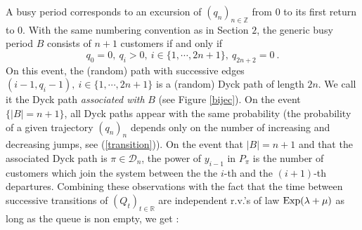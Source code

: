 \documentclass[11pt,a4paper]{article}
\numberwithin{equation}{section}
\newcommand{\mrm}[1]{\text{\rm #1}}
\newcommand{\D}{\mathcal{D}}
\newcommand{\R}{\mathbb{R}}
\newcommand{\1}{\mathbbm{1}}
\newcommand{\Z}{\mathbb{Z}}
\begin{document}
A busy period corresponds to an excursion of $(q_n)_{n\in\Z}$ from $0$ to its first return to $0$.
With the same numbering convention as in Section $2$,
the generic busy period $B$ consists of $n+1$ customers if and only if
\begin{equation}
q_0=0,\:q_i>0,\: i \in \{1,\cdots,2n+1\},\:q_{2n+2}=0\:.
\end{equation}
On this event, the (random) path with  successive edges
$(i-1,q_i-1),\:i\in\{1,\cdots,2n+1\}$ is a (random) Dyck path of
length $2n$. We call it the Dyck path {\em associated with} $B$
(see  Figure \ref{bijec}). On the event $\{|B|=n+1\}$, all Dyck
paths appear with the same probability (the probability of a given
trajectory $(q_n)_n$ depends only on the number of increasing and
decreasing jumps, see (\ref{transition})). On the event that
$|B|=n+1$ and that the associated Dyck path is $\pi \in \D_n$, the
power of $y_{i-1}$ in $P_{\pi}$ is the number of customers which
join the system between the the $i$-th and the $(i+1)$-th
departures. Combining these observations with the fact that the
time between successive transitions of $(Q_t)_{t\in\R}$ are
independent r.v.'s of law $\mrm{Exp}(\lambda+\mu)$ as long as the
queue is non empty, we get :
\end{document}
